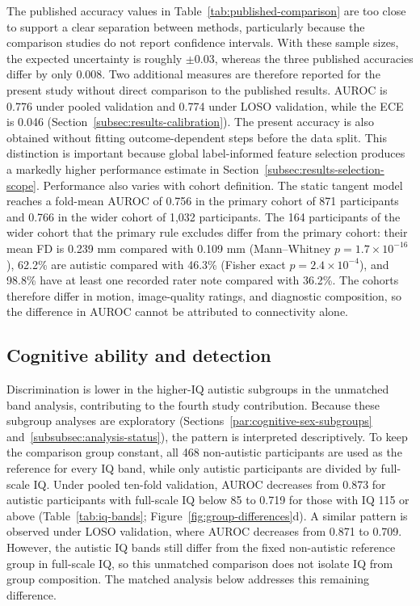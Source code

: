 The published accuracy values in Table~\ref{tab:published-comparison} are too close to support a clear separation between methods, particularly because the comparison studies do not report confidence intervals. With these sample sizes, the expected uncertainty is roughly $\pm0.03$, whereas the three published accuracies differ by only 0.008. Two additional measures are therefore reported for the present study without direct comparison to the published results. AUROC is 0.776 under pooled validation and 0.774 under LOSO validation, while the ECE is 0.046 (Section~\ref{subsec:results-calibration}). The present accuracy is also obtained without fitting outcome-dependent steps before the data split. This distinction is important because global label-informed feature selection produces a markedly higher performance estimate in Section~\ref{subsec:results-selection-scope}. Performance also varies with cohort definition. The static tangent model reaches a fold-mean AUROC of 0.756 in the primary cohort of 871 participants and 0.766 in the wider cohort of 1,032 participants. The 164 participants of the wider cohort that the primary rule excludes differ from the primary cohort: their mean FD is 0.239 mm compared with 0.109 mm (Mann--Whitney $p=1.7\times10^{-16}$), 62.2\% are autistic compared with 46.3\% (Fisher exact $p=2.4\times10^{-4}$), and 98.8\% have at least one recorded rater note compared with 36.2\%. The cohorts therefore differ in motion, image-quality ratings, and diagnostic composition, so the difference in AUROC cannot be attributed to connectivity alone.

\subsection{Cognitive ability and detection}
\label{subsec:results-cognitive-ability}

Discrimination is lower in the higher-IQ autistic subgroups in the unmatched band analysis, contributing to the fourth study contribution. Because these subgroup analyses are exploratory (Sections~\ref{par:cognitive-sex-subgroups} and~\ref{subsubsec:analysis-status}), the pattern is interpreted descriptively. To keep the comparison group constant, all 468 non-autistic participants are used as the reference for every IQ band, while only autistic participants are divided by full-scale IQ. Under pooled ten-fold validation, AUROC decreases from 0.873 for autistic participants with full-scale IQ below 85 to 0.719 for those with IQ 115 or above (Table~\ref{tab:iq-bands}; Figure~\ref{fig:group-differences}d). A similar pattern is observed under LOSO validation, where AUROC decreases from 0.871 to 0.709. However, the autistic IQ bands still differ from the fixed non-autistic reference group in full-scale IQ, so this unmatched comparison does not isolate IQ from group composition. The matched analysis below addresses this remaining difference.

